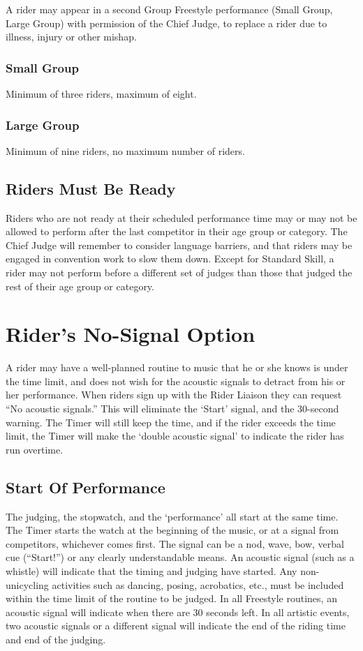 A rider may appear in a second Group Freestyle performance (Small Group, Large Group) with permission of the Chief Judge, to replace a rider due to illness, injury or other mishap. 

\subsubsection{Small Group}
Minimum of three riders, maximum of eight.

\subsubsection{Large Group}
Minimum of nine riders, no maximum number of riders.

\subsection{Riders Must Be Ready}
Riders who are not ready at their scheduled performance time may or may not be allowed to perform after the last competitor in their age group or category.
The Chief Judge will remember to consider language barriers, and that riders may be engaged in convention work to slow them down.
Except for Standard Skill, a rider may not perform before a different set of judges than those that judged the rest of their age group or category.

\section{Rider's No-Signal Option}

A rider may have a well-planned routine to music that he or she knows is under the time limit, and does not wish for the acoustic signals to detract from his or her performance.
When riders sign up with the Rider Liaison they can request ``No acoustic signals.'' This will eliminate the `Start' signal, and the 30-second warning.
The Timer will still keep the time, and if the rider exceeds the time limit, the Timer will make the `double acoustic signal' to indicate the rider has run overtime.

\subsection{Start Of Performance}
The judging, the stopwatch, and the `performance' all start at the same time.
The Timer starts the watch at the beginning of the music, or at a signal from competitors, whichever comes first.
The signal can be a nod, wave, bow, verbal cue (``Start!'') or any clearly understandable means.
An acoustic signal (such as a whistle) will indicate that the timing and judging have started.
Any non-unicycling activities such as dancing, posing, acrobatics, etc., must be included within the time limit of the routine to be judged.
In all Freestyle routines, an acoustic signal will indicate when there are 30 seconds left.
In all artistic events, two acoustic signals or a different signal will indicate the end of the riding time and end of the judging.


